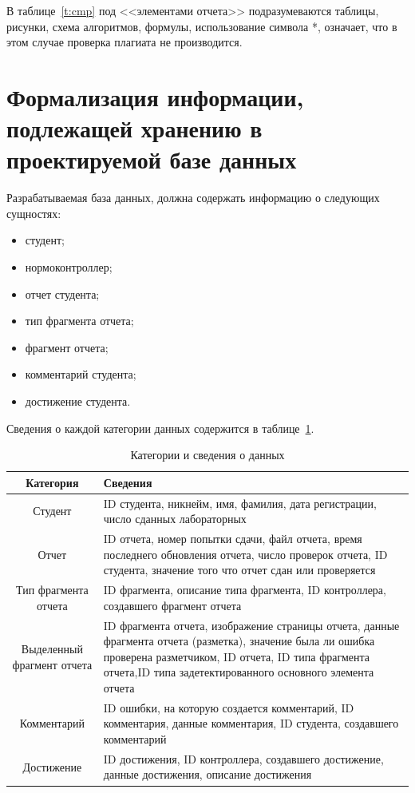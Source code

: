 В таблице~\ref{t:cmp} под <<элементами отчета>> подразумеваются таблицы, рисунки, схема алгоритмов, формулы, использование символа *, означает, что в этом случае проверка плагиата не производится.

\section{Формализация информации, подлежащей хранению в проектируемой базе данных}
Разрабатываемая база данных, должна содержать информацию о следующих сущностях:
\begin{itemize}
	\item студент;
	\item нормоконтроллер;
	\item отчет студента;
	\item тип фрагмента отчета;
	\item фрагмент отчета;
	\item комментарий студента;
	\item достижение студента.
\end{itemize}

Сведения о каждой категории данных содержится в таблице~\ref{t:data_store}.

\begin{table}[ht]
	\begin{center}
		\begin{threeparttable}
			\caption{\label{t:data_store} Категории и сведения о данных}
			\begin{tabular}{|c|p{8cm}|}
				\hline
				\textbf{Категория} & \textbf{Сведения} \\ \hline
				Студент & ID студента, никнейм, имя, фамилия, дата регистрации, число сданных лабораторных\\ \hline
				Отчет & ID отчета, номер попытки сдачи, файл отчета, время последнего обновления отчета, число проверок отчета, ID студента, значение того что отчет сдан или проверяется \\ \hline
				Тип фрагмента отчета & ID фрагмента, описание типа фрагмента, ID контроллера, создавшего фрагмент отчета \\ \hline
				Выделенный фрагмент отчета & ID фрагмента отчета, изображение страницы отчета, данные фрагмента отчета (разметка), значение была ли ошибка проверена разметчиком, ID отчета, ID типа фрагмента отчета,ID типа задетектированного основного элемента отчета\\ \hline
				Комментарий & ID ошибки, на которую создается комментарий, ID комментария, данные комментария, ID студента, создавшего комментарий \\ \hline
				Достижение & ID достижения, ID контроллера, создавшего достижение, данные достижения, описание достижения \\ \hline
			\end{tabular}
		\end{threeparttable}
	\end{center}
\end{table}

